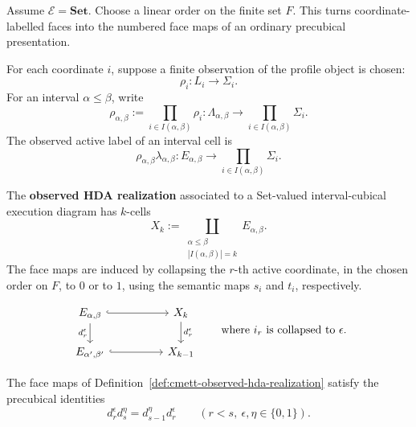 Assume \(\mathcal E=\mathbf{Set}\). Choose a linear order on the finite set
\(F\). This turns coordinate-labelled faces into the numbered face maps of an
ordinary precubical presentation.

For each coordinate \(i\), suppose a finite observation of the profile object
is chosen:
\[
    \rho_i:L_i\to\Sigma_i.
\]
For an interval \(\alpha\leq\beta\), write
\[
    \rho_{\alpha,\beta}
    :=
    \prod_{i\in I(\alpha,\beta)}\rho_i:
    \Lambda_{\alpha,\beta}\to
    \prod_{i\in I(\alpha,\beta)}\Sigma_i.
\]
The observed active label of an interval cell is
\[
    \rho_{\alpha,\beta}\lambda_{\alpha,\beta}:
    E_{\alpha,\beta}\to
    \prod_{i\in I(\alpha,\beta)}\Sigma_i.
\]

\begin{definition}
\label{def:cmett-observed-hda-realization}
    The \textbf{observed HDA realization} associated to a Set-valued
    interval-cubical execution diagram has \(k\)-cells
    \[
        X_k
        :=
        \coprod_{\substack{\alpha\leq\beta\\ |I(\alpha,\beta)|=k}}
        E_{\alpha,\beta}.
    \]
    The face maps are induced by collapsing the \(r\)-th active coordinate,
    in the chosen order on \(F\), to \(0\) or to \(1\), using the semantic
    maps \(s_i\) and \(t_i\), respectively.
\end{definition}

\[
\begin{tikzcd}[column sep=huge]
E_{\alpha,\beta}
    \arrow[r,hook]
    \arrow[d,"d_r^\epsilon"']
&
X_k
    \arrow[d,"d_r^\epsilon"]
\\
E_{\alpha',\beta'}
    \arrow[r,hook]
&
X_{k-1}
\end{tikzcd}
\qquad
\text{where \(i_r\) is collapsed to \(\epsilon\).}
\]

\begin{proposition}
\label{prop:cmett-precubical-identities}
    The face maps of
    Definition~\ref{def:cmett-observed-hda-realization} satisfy the
    precubical identities
    \[
        d_r^\epsilon d_s^\eta
        =
        d_{s-1}^\eta d_r^\epsilon
        \qquad
        (r<s,\ \epsilon,\eta\in\{0,1\}).
    \]
\end{proposition}

